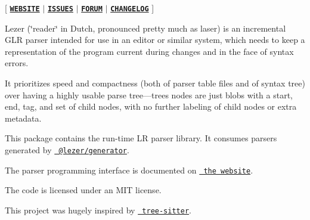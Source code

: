 \mbox{[} \href{http://lezer.codemirror.net}{\texttt{ {\bfseries{W\+E\+B\+S\+I\+TE}}}} $\vert$ \href{https://github.com/lezer-parser/lezer/issues}{\texttt{ {\bfseries{I\+S\+S\+U\+ES}}}} $\vert$ \href{https://discuss.codemirror.net/c/lezer}{\texttt{ {\bfseries{F\+O\+R\+UM}}}} $\vert$ \href{https://github.com/lezer-parser/lr/blob/master/CHANGELOG.md}{\texttt{ {\bfseries{C\+H\+A\+N\+G\+E\+L\+OG}}}} \mbox{]}

Lezer (\char`\"{}reader\char`\"{} in Dutch, pronounced pretty much as laser) is an incremental G\+LR parser intended for use in an editor or similar system, which needs to keep a representation of the program current during changes and in the face of syntax errors.

It prioritizes speed and compactness (both of parser table files and of syntax tree) over having a highly usable parse tree—trees nodes are just blobs with a start, end, tag, and set of child nodes, with no further labeling of child nodes or extra metadata.

This package contains the run-\/time LR parser library. It consumes parsers generated by \href{https://github.com/lezer-parser/generator}{\texttt{ @lezer/generator}}.

The parser programming interface is documented on \href{https://lezer.codemirror.net/docs/ref/\#lr}{\texttt{ the website}}.

The code is licensed under an M\+IT license.

This project was hugely inspired by \href{http://tree-sitter.github.io/tree-sitter/}{\texttt{ tree-\/sitter}}. 